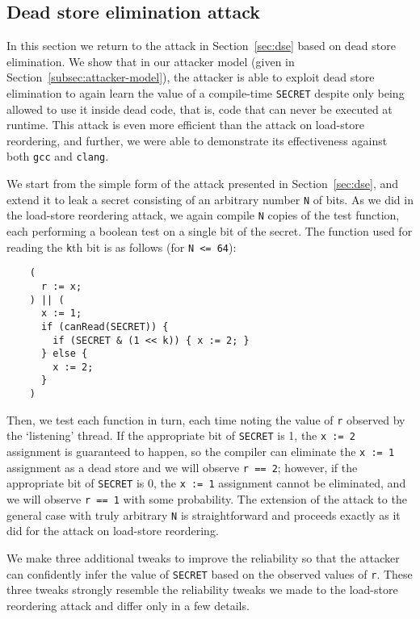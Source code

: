 \subsection{Dead store elimination attack}
\label{subsec:exp-dse}

In this section we return to the attack in Section~\ref{sec:dse} based on
dead store elimination.
We show that in our attacker model (given in
Section~\ref{subsec:attacker-model}), the attacker is able to exploit dead
store elimination to again learn the value of a compile-time \verb|SECRET|
despite only being allowed to use it inside dead code, that is, code that can
never be executed at runtime.
This attack is even more efficient than the attack on load-store reordering,
and further, we were able to demonstrate its effectiveness against both
\verb|gcc| and \verb|clang|.

We start from the simple form of the attack presented in
Section~\ref{sec:dse}, and extend it to leak a secret consisting of an
arbitrary number \verb|N| of bits.
As we did in the load-store reordering attack, we again compile \verb|N| copies
of the test function, each performing a boolean test on a single bit of the
secret.
The function used for reading the \verb|k|th bit is as follows (for
\verb|N <= 64|):
\begin{verbatim}
    (
      r := x;
    ) || (
      x := 1;
      if (canRead(SECRET)) {
        if (SECRET & (1 << k)) { x := 2; }
      } else {
        x := 2;
      }
    )
\end{verbatim}
Then, we test each function in turn, each time noting the value of \verb|r|
observed by the `listening' thread.
If the appropriate bit of \verb|SECRET| is 1, the \verb|x := 2| assignment is
guaranteed to happen, so the compiler can eliminate the \verb|x := 1|
assignment as a dead store and we will observe \verb|r == 2|; however, if the
appropriate bit of \verb|SECRET| is 0, the \verb|x := 1| assignment cannot be
eliminated, and we will observe \verb|r == 1| with some probability.
The extension of the attack to the general case with truly arbitrary \verb|N|
is straightforward and proceeds exactly as it did for the attack on
load-store reordering.

We make three additional tweaks to improve the reliability so that the attacker
can confidently infer the value of \verb|SECRET| based on the observed values
of \verb|r|.
These three tweaks strongly resemble the reliability tweaks we made to the
load-store reordering attack and differ only in a few details.

